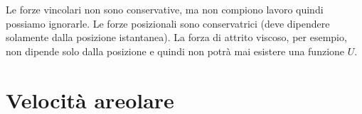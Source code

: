 \documentclass[a4paper]{article}
\begin{document}
Le forze vincolari non sono conservative, ma non compiono lavoro quindi possiamo ignorarle.
Le forze posizionali sono conservatrici (deve dipendere solamente dalla posizione istantanea).
La forza di attrito viscoso, per esempio, non dipende solo dalla posizione e quindi non potrà mai esistere
una funzione \(U\).

\pagebreak

\section{Velocità areolare}

\pagebreak

%
%

\end{document}
